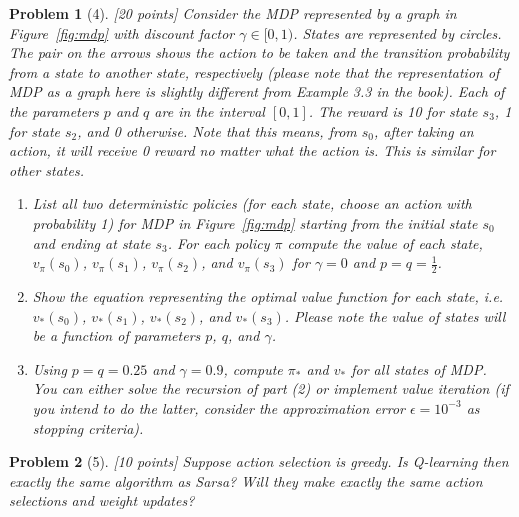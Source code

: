 \documentclass[12pt]{article}
\theoremstyle{quest}
\newtheorem*{problem}{Problem}
\begin{document}
\begin{problem}[4] [20 points] Consider the MDP represented by a graph in Figure~\ref{fig:mdp} with discount factor $\gamma \in [0, 1)$. States are represented by circles. The pair on the arrows shows the action to be taken and the transition probability from a state to another state, respectively (please note that the representation of MDP as a graph here is slightly different from Example 3.3 in the book). Each of the parameters $p$ and $q$ are in the interval $[0, 1]$. The reward is 10 for state $s_3$, 1 for state $s_2$, and 0 otherwise. Note that this means, from $s_0$, after taking an action, it will receive 0 reward no matter what the action is. This is similar for other states. 
\begin{enumerate}
    \item List all two deterministic policies (for each state, choose an action with probability 1) for MDP in Figure~\ref{fig:mdp} starting from the initial state $s_0$ and ending at state $s_3$. For each policy $\pi$ compute the value of each state, $v_{\pi}(s_0)$, $v_{\pi}(s_1)$, $v_{\pi}(s_2)$, and $v_{\pi}(s_3)$ for $\gamma = 0$ and $p = q = \frac{1}{2}$.
    \item Show the equation representing the optimal value function for each state, i.e. $v_{\ast}(s_0)$, $v_{\ast}(s_1)$, $v_{\ast}(s_2)$, and $v_{\ast}(s_3)$. Please note the value of states will be a function of parameters $p$, $q$, and $\gamma$.
    \item Using $p = q = 0.25$ and $\gamma = 0.9$, compute $\pi_{\ast}$ and $v_{\ast}$ for all states of MDP. You can either solve the recursion of part (2) or implement value iteration (if you intend to do the latter, consider the approximation error $\epsilon = 10^{−3}$ as stopping criteria).
\end{enumerate}

\end{problem}

\begin{problem}[5] [10 points]
Suppose action selection is greedy. Is Q-learning then exactly the same algorithm as Sarsa? Will they make exactly the same action selections and weight updates?
\end{problem}
\end{document}

